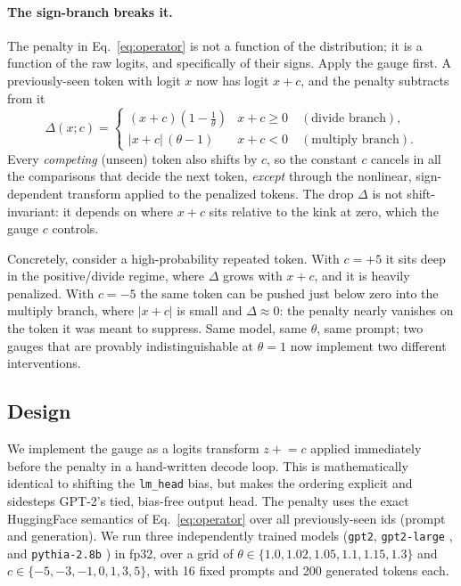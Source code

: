 \documentclass[11pt]{article}
\newcommand{\thp}{\theta}
\newcommand{\code}[1]{\texttt{#1}}
\begin{document}
\paragraph{The sign-branch breaks it.} The penalty in Eq.~\eqref{eq:operator} is not a
function of the distribution; it is a function of the raw logits, and specifically of
their signs. Apply the gauge first. A previously-seen token with logit $x$ now has logit
$x + c$, and the penalty subtracts from it
\begin{equation}
\label{eq:drop}
\Delta(x;c) =
\begin{cases}
(x+c)\left(1 - \tfrac{1}{\thp}\right) & x + c \ge 0 \quad(\text{divide branch}),\\[4pt]
|x+c|\,(\thp - 1) & x + c < 0 \quad(\text{multiply branch}).
\end{cases}
\end{equation}
Every \emph{competing} (unseen) token also shifts by $c$, so the constant $c$ cancels in
all the comparisons that decide the next token, \emph{except} through the nonlinear,
sign-dependent transform applied to the penalized tokens. The drop $\Delta$ is not
shift-invariant: it depends on where $x+c$ sits relative to the kink at zero, which the
gauge $c$ controls.

Concretely, consider a high-probability repeated token. With $c = +5$ it sits deep in the
positive/divide regime, where $\Delta$ grows with $x+c$, and it is heavily penalized. With
$c = -5$ the same token can be pushed just below zero into the multiply branch, where
$|x+c|$ is small and $\Delta \approx 0$: the penalty nearly vanishes on the
token it was meant to suppress. Same model, same $\thp$, same prompt; two gauges that
are provably indistinguishable at $\thp=1$ now implement two different interventions.

\subsection{Design}
\label{sec:a1-design}

We implement the gauge as a logits transform $z \mathrel{+}= c$ applied immediately before
the penalty in a hand-written decode loop. This is mathematically identical to shifting
the \code{lm\_head} bias, but makes the ordering explicit and sidesteps GPT-2's tied,
bias-free output head. The penalty uses the exact HuggingFace semantics of
Eq.~\eqref{eq:operator} over all previously-seen ids (prompt and generation). We run three
independently trained models (\code{gpt2}, \code{gpt2-large} \citep{radford2019gpt2}, and
\code{pythia-2.8b} \citep{biderman2023pythia}) in fp32, over a grid of
$\thp \in \{1.0, 1.02, 1.05, 1.1, 1.15, 1.3\}$ and $c \in \{-5,-3,-1,0,1,3,5\}$, with
16 fixed prompts and 200 generated tokens each.
\end{document}
